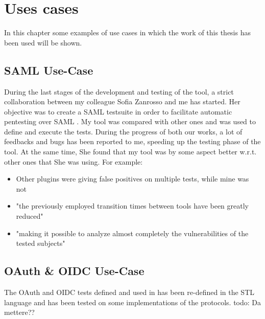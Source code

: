 \chapter{Uses cases}
In this chapter some examples of use cases in which the work of this thesis has been used will be shown.

\section{SAML Use-Case}
During the last stages of the development and testing of the tool, a strict collaboration between my colleague Sofia Zanrosso and me has started. Her objective was to create a SAML testsuite in order to facilitate automatic pentesting over SAML \cite{sofia_zanrosso}. My tool was compared with other ones and was used to define and execute the tests. During the progress of both our works, a lot of feedbacks and bugs has been reported to me, speeding up the testing phase of the tool. At the same time, She found that my tool was by some aspect better w.r.t. other ones that She was using. For example:
\begin{itemize}
    \item Other plugins were giving false positives on multiple tests, while mine was not
    \item "the previously employed transition times between tools have been greatly reduced"
    \item "making it possible to analyze almost completely the vulnerabilities of the tested subjects"
\end{itemize}


\section{OAuth \& OIDC Use-Case}
The \Gls{OAuth} and \Gls{OIDC} tests defined and used in \cite{claudio_grisenti,wendy_barreto} has been re-defined in the STL language and has been tested on some implementations of the protocols.
todo: Da mettere??




